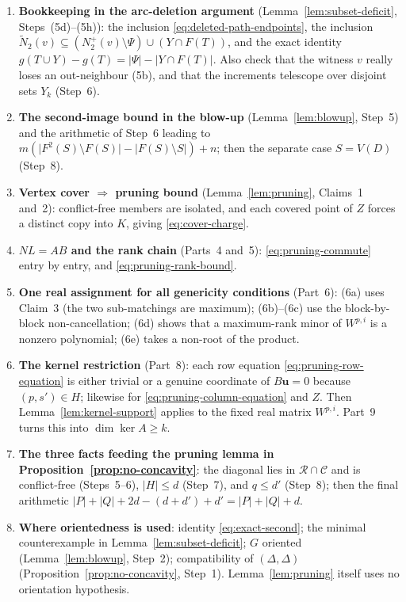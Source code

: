 \documentclass[11pt]{article}
\theoremstyle{remark}
\newcommand{\abs}[1]{\lvert #1\rvert}
\newcommand{\cR}{\mathcal R}
\newcommand{\cC}{\mathcal C}
\newcommand{\bu}{\mathbf u}
\newcommand{\tN}{\widetilde N}
\begin{document}
\begin{enumerate}[leftmargin=2em]
\item \textbf{Bookkeeping in the arc-deletion argument}
(Lemma~\ref{lem:subset-deficit}, Steps~(5d)--(5h)): the inclusion
\eqref{eq:deleted-path-endpoints}, the inclusion
$\tN_2(v)\subseteq(N_2^+(v)\setminus\Psi)\cup(Y\cap F(T))$, and the exact
identity $g(T\cup Y)-g(T)=\abs\Psi-\abs{Y\cap F(T)}$. Also check that the
witness $v$ really loses an out-neighbour (5b), and that the increments
telescope over disjoint sets $Y_k$ (Step~6).
\item \textbf{The second-image bound in the blow-up}
(Lemma~\ref{lem:blowup}, Step~5) and the arithmetic of Step~6 leading to
$m(\abs{F^2(S)\setminus F(S)}-\abs{F(S)\setminus S})+n$; then the separate
case $S=V(D)$ (Step~8).
\item \textbf{Vertex cover $\Rightarrow$ pruning bound}
(Lemma~\ref{lem:pruning}, Claims~1 and~2): conflict-free members are
isolated, and each covered point of $Z$ forces a distinct copy into $K$,
giving \eqref{eq:cover-charge}.
\item \textbf{$NL=AB$ and the rank chain} (Parts~4 and~5):
\eqref{eq:pruning-commute} entry by entry, and
\eqref{eq:pruning-rank-bound}.
\item \textbf{One real assignment for all genericity conditions} (Part~6):
(6a) uses Claim~3 (the two sub-matchings are maximum); (6b)--(6c) use the
block-by-block non-cancellation; (6d) shows that a maximum-rank minor of
$W^{p,i}$ is a nonzero polynomial; (6e) takes a non-root of the product.
\item \textbf{The kernel restriction} (Part~8): each row equation
\eqref{eq:pruning-row-equation} is either trivial or a genuine coordinate of
$B\bu=0$ because $(p,s')\in H$; likewise for
\eqref{eq:pruning-column-equation} and $Z$. Then
Lemma~\ref{lem:kernel-support} applies to the fixed real matrix $W^{p,i}$.
Part~9 turns this into $\dim\ker A\ge k$.
\item \textbf{The three facts feeding the pruning lemma in
Proposition~\ref{prop:no-concavity}}: the diagonal lies in $\cR\cap\cC$ and
is conflict-free (Steps~5--6), $\abs H\le d$ (Step~7), and $q\le d'$
(Step~8); then the final arithmetic
$\abs P+\abs Q+2d-(d+d')+d'=\abs P+\abs Q+d$.
\item \textbf{Where orientedness is used}: identity
\eqref{eq:exact-second}; the minimal counterexample in
Lemma~\ref{lem:subset-deficit}; $G$ oriented
(Lemma~\ref{lem:blowup}, Step~2); compatibility of $(\Delta,\Delta)$
(Proposition~\ref{prop:no-concavity}, Step~1). Lemma~\ref{lem:pruning}
itself uses no orientation hypothesis.
\end{enumerate}



\end{document}
